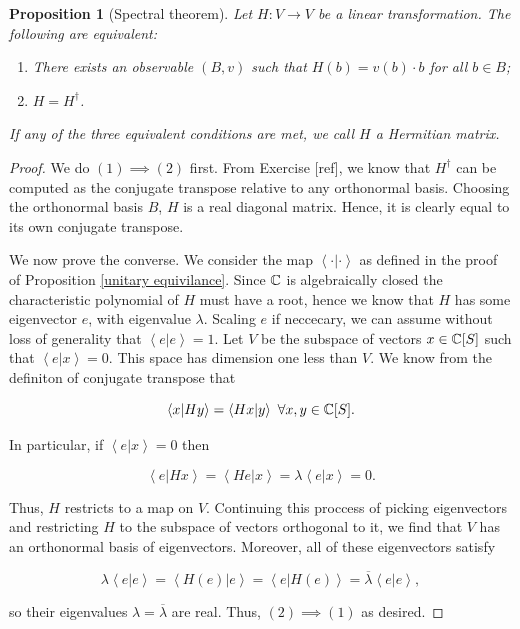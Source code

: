 \documentclass{article}
\newtheorem{proposition}{Proposition}[section]
\theoremstyle{definition}
\numberwithin{figure}{section}
\begin{document}
\begin{proposition}[Spectral theorem]\label{Spectral theorem} Let $H: V\to V$ be a linear transformation. The following are equivalent:

\begin{enumerate}
\item There exists an observable $(B,v)$ such that $H(b)=v(b)\cdot b$ for all $b\in B$;
\item $H=H^{\dagger}$.
\end{enumerate}

If any of the three equivalent conditions are met, we call $H$ a Hermitian matrix.
\end{proposition}
\begin{proof} We do $(1)\implies (2)$ first. From Exercise [ref], we know that $H^{\dagger}$ can be computed as the conjugate transpose relative to any orthonormal basis. Choosing the orthonormal basis $B$, $H$ is a real diagonal matrix. Hence, it is clearly equal to its own conjugate transpose.

We now prove the converse. We consider the map $\left<\cdot |\cdot \right>$ as defined in the proof of Proposition \ref{unitary equivilance}. Since $\mathbb{C}$ is algebraically closed the characteristic polynomial of $H$ must have a root, hence we know that $H$ has some eigenvector $e$, with eigenvalue $\lambda$. Scaling $e$ if neccecary, we can assume without loss of generality that $\left<e | e\right> = 1$. Let $V$ be the subspace of vectors $x\in \mathbb{C}[S]$ such that $\left<e | x\right>=0$. This space has dimension one less than $V$. We know from the definiton of conjugate transpose that

$$\left<x | Hy\right>=\left<Hx |y\right>\,\, \forall x,y\in \mathbb{C}[S].$$

In particular, if $\left<e | x\right>=0$ then

$$\left< e | Hx \right>=\left<He | x \right>=\lambda \left< e| x \right>=0.$$

Thus, $H$ restricts to a map on $V$. Continuing this proccess of picking eigenvectors and restricting $H$ to the subspace of vectors orthogonal to it, we find that $V$ has an orthonormal basis of eigenvectors. Moreover, all of these eigenvectors satisfy

$$\lambda \left<e | e\right>=\left<H(e) | e\right>=\left<e | H(e)\right>=\overline{\lambda}\left<e | e\right>,$$

so their eigenvalues $\lambda=\overline{\lambda}$ are real. Thus, $(2)\implies (1)$ as desired.
\end{proof}
\end{document}
